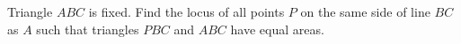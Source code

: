 Triangle $ABC$ is fixed. Find the locus of all points $P$ on the same side of line $BC$ as $A$ such that triangles $PBC$ and $ABC$ have equal areas.
